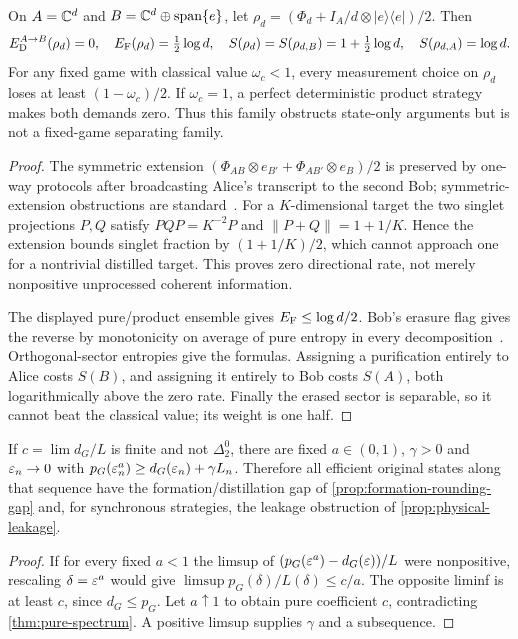 \begin{proposition}\label{prop:half-erasure}
On $A=\mathbb C^d$ and $B=\mathbb C^d\oplus\operatorname{span}\{e\}$, let $\rho_d=(\Phi_d+I_A/d\otimes|e\rangle\langle e|)/2$. Then
\[
 E_{\mathrm D}^{A\to B}(\rho_d)=0,\quad E_{\mathrm F}(\rho_d)=\tfrac12\log d,\quad
 S(\rho_d)=S(\rho_{d,B})=1+\tfrac12\log d,\quad S(\rho_{d,A})=\log d.
\]
For any fixed game with classical value $\omega_c<1$, every measurement choice on $\rho_d$ loses at least $(1-\omega_c)/2$. If $\omega_c=1$, a perfect deterministic product strategy makes both demands zero. Thus this family obstructs state-only arguments but is not a fixed-game separating family.
\end{proposition}
\begin{proof}
The symmetric extension $(\Phi_{AB}\otimes e_{B'}+\Phi_{AB'}\otimes e_B)/2$ is preserved by one-way protocols after broadcasting Alice's transcript to the second Bob; symmetric-extension obstructions are standard~\cite{HN05,MCL06}. For a $K$-dimensional target the two singlet projections $P,Q$ satisfy $PQP=K^{-2}P$ and $\|P+Q\|=1+1/K$. Hence the extension bounds singlet fraction by $(1+1/K)/2$, which cannot approach one for a nontrivial distilled target. This proves zero directional rate, not merely nonpositive unprocessed coherent information.

The displayed pure/product ensemble gives $E_{\mathrm F}\le\log d/2$. Bob's erasure flag gives the reverse by monotonicity on average of pure entropy in every decomposition~\cite{BDSW96}. Orthogonal-sector entropies give the formulas. Assigning a purification entirely to Alice costs $S(B)$, and assigning it entirely to Bob costs $S(A)$, both logarithmically above the zero rate. Finally the erased sector is separable, so it cannot beat the classical value; its weight is one half.
\end{proof}

\begin{proposition}\label{prop:nonlimit-coefficient-gap}
If $c=\lim d_G/L$ is finite and not $\Delta^0_2$, there are fixed $a\in(0,1)$, $\gamma>0$ and $\varepsilon_n\to0$ with $p_G(\varepsilon_n^a)\ge d_G(\varepsilon_n)+\gamma L_n$. Therefore all efficient original states along that sequence have the formation/distillation gap of \cref{prop:formation-rounding-gap} and, for synchronous strategies, the leakage obstruction of \cref{prop:physical-leakage}.
\end{proposition}
\begin{proof}
If for every fixed $a<1$ the limsup of $(p_G(\varepsilon^a)-d_G(\varepsilon))/L$ were nonpositive, rescaling $\delta=\varepsilon^a$ would give $\limsup p_G(\delta)/L(\delta)\le c/a$. The opposite liminf is at least $c$, since $d_G\le p_G$. Let $a\uparrow1$ to obtain pure coefficient $c$, contradicting \cref{thm:pure-spectrum}. A positive limsup supplies $\gamma$ and a subsequence.
\end{proof}

